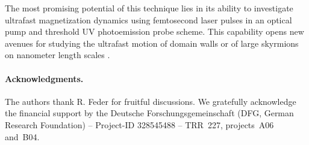 \documentclass[prl,twocolumn,floatfix,superscriptaddress,aps]{revtex4-2}
\begin{document}
The most promising potential of this technique lies in its ability to investigate ultrafast magnetization dynamics using femtosecond laser pulses in an optical pump and threshold UV photoemission probe scheme. This capability opens new avenues for studying the ultrafast motion of domain walls \cite{parkin2008} or of large skyrmions on nanometer length scales \cite{goebel2019,jani2021,kern2022}.

\paragraph{Acknowledgments.} 
The authors thank R. Feder for fruitful discussions. We gratefully acknowledge the financial support by the Deutsche Forschungsgemeinschaft (DFG, German Research Foundation) -- Project-ID 328545488 -- TRR~227, projects~A06 and~B04.
\end{document}

